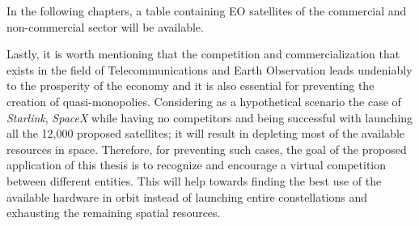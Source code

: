 \begin{center}
\begin{adjustbox}{width=0.9\textwidth}
\begin{tabular}{||c| c |c |c |c||}


\hline
\end{tabular}
\label{table:EO}
\end{adjustbox}
\end{center}
\bigskip

\normalsize

In the following chapters, a table containing EO satellites of the commercial and non-commercial sector will be available.

Lastly, it is worth mentioning that the competition and commercialization that exists in the field of Telecommunications and Earth Observation leads undeniably to the prosperity of the economy and it is also essential for preventing the creation of quasi-monopolies. Considering as a hypothetical scenario the case of \textit{Starlink}, \textit{SpaceX} while having no competitors and being successful with launching all the 12,000 proposed satellites; it will result in depleting most of the available resources in space. Therefore, for preventing such cases, the goal of the proposed application of this thesis is to recognize and encourage a virtual competition between different entities. This will help towards finding the best use of the available hardware in orbit instead of launching entire constellations and exhausting the remaining spatial resources.


